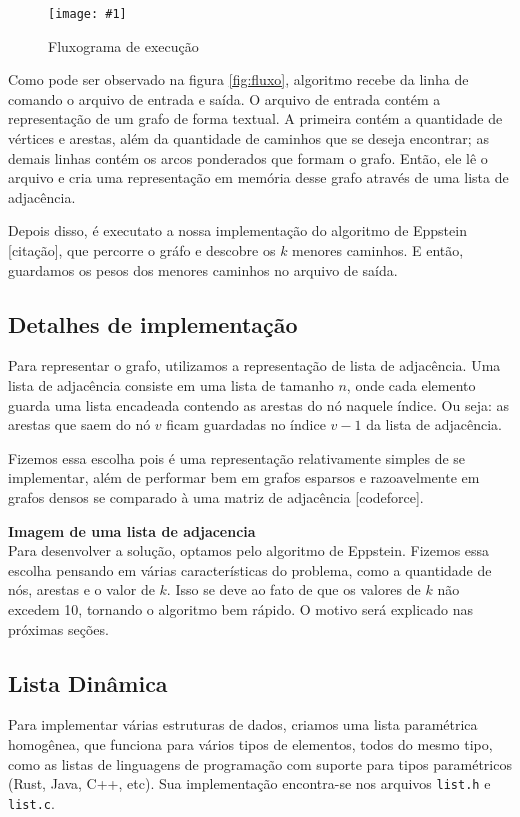 \documentclass[12pt]{article}
\newcommand\image[2]{\noindent \begin{figure}[h]
    \texttt{[image: \#1]}
    \label{fig: #1}
    \caption{#2}
    \end{figure}
    }
\begin{document}
    \image{fluxo}{Fluxograma de execução}

    Como pode ser observado na figura \ref{fig:fluxo}, algoritmo recebe da linha de
    comando o arquivo de entrada e saída. O arquivo de entrada contém a
    representação de um grafo de forma textual. A primeira contém a quantidade
    de vértices e arestas, além da quantidade de caminhos que se deseja
    encontrar; as demais linhas contém os arcos ponderados que formam o grafo.
    Então, ele lê o arquivo e cria uma representação em memória desse grafo
    através de uma lista de adjacência.

    Depois disso, é executato a nossa implementação do algoritmo de Eppstein
    [citação], que percorre o gráfo e descobre os $k$ menores caminhos. E então,
    guardamos os pesos dos menores caminhos no arquivo de saída.

    \subsection{Detalhes de implementação}
    Para representar o grafo, utilizamos a representação de lista de adjacência.
    Uma lista de adjacência consiste em uma lista de tamanho $n$, onde cada
    elemento guarda uma lista encadeada contendo as arestas do nó naquele
    índice. Ou seja: as arestas que saem do nó $v$ ficam guardadas no índice
    $v-1$ da lista de adjacência.

    Fizemos essa escolha pois é uma representação relativamente simples de se
    implementar, além de performar bem em grafos esparsos e razoavelmente em
    grafos densos se comparado à uma matriz de adjacência [codeforce].

    \textbf{Imagem de uma lista de adjacencia}
    \\

    Para desenvolver a solução, optamos pelo algoritmo de Eppstein. Fizemos essa
    escolha pensando em várias características do problema, como a quantidade de
    nós, arestas e o valor de $k$. Isso se deve ao fato de que os valores de $k$
    não excedem 10, tornando o algoritmo bem rápido. O motivo será explicado nas
    próximas seções.

    \subsection{Lista Dinâmica}
    Para implementar várias estruturas de dados, criamos uma lista paramétrica
    homogênea, que funciona para vários tipos de elementos, todos do mesmo tipo,
    como as listas de linguagens de programação com suporte para tipos
    paramétricos (Rust, Java, C++, etc). Sua implementação encontra-se nos
    arquivos \texttt{list.h} e \texttt{list.c}.
\end{document}
